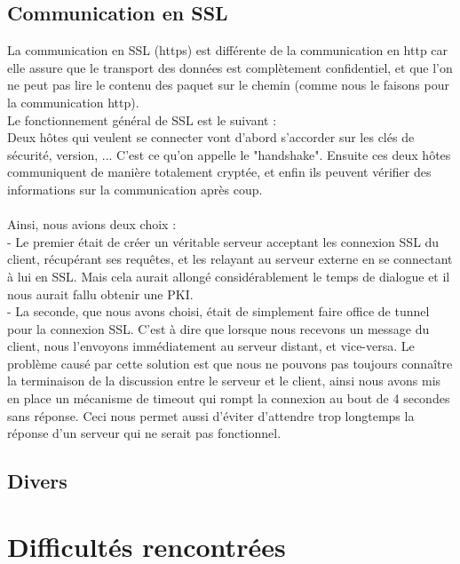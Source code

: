 \documentclass{scrreprt}
\begin{document}
\subsection{Communication en SSL}

La communication en SSL (https) est différente de la communication en http car elle assure que le transport des données est complètement confidentiel, et que l'on ne peut pas lire le contenu des paquet sur le chemin (comme nous le faisons pour la communication http).\\ Le fonctionnement général de SSL est le suivant : \\
Deux hôtes qui veulent se connecter vont d'abord s'accorder sur les clés de sécurité, version, ... C'est ce qu'on appelle le "handshake". Ensuite ces deux hôtes communiquent de manière totalement cryptée, et enfin ils peuvent vérifier des informations sur la communication après coup.\\\\

Ainsi, nous avions deux choix :\\
- Le premier était de créer un véritable serveur acceptant les connexion SSL du client, récupérant ses requêtes, et les relayant au serveur externe en se connectant à lui en SSL. Mais cela aurait allongé considérablement le temps de dialogue et il nous aurait fallu obtenir une PKI.\\
- La seconde, que nous avons choisi, était de simplement faire office de tunnel pour la connexion SSL. C'est à dire que lorsque nous recevons un message du client, nous l'envoyons immédiatement au serveur distant, et vice-versa. Le problème causé par cette solution est que nous ne pouvons pas toujours connaître la terminaison de la discussion entre le serveur et le client, ainsi nous avons mis en place un mécanisme de timeout qui rompt la connexion au bout de 4 secondes sans réponse. Ceci nous permet aussi d'éviter d'attendre trop longtemps la réponse d'un serveur qui ne serait pas fonctionnel.

\subsection{Divers}

\section{Difficultés rencontrées}
\end{document}
